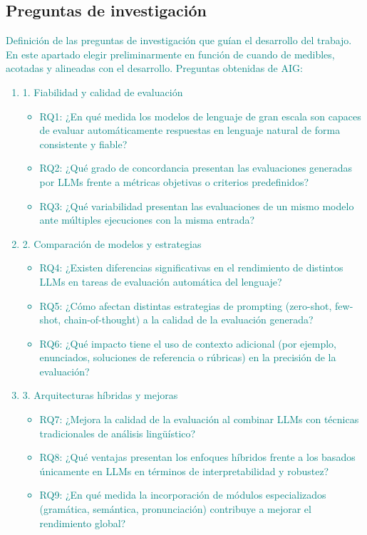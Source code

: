 \subsection{Preguntas de investigación}
\textcolor{teal}{Definición de las preguntas de investigación que guían el desarrollo del trabajo. En este apartado elegir preliminarmente en función de cuando de medibles, acotadas y alineadas con el desarrollo. Preguntas obtenidas de AIG:
\begin{enumerate}
    \item 1. Fiabilidad y calidad de evaluación
    \begin{itemize}
        \item RQ1: ¿En qué medida los modelos de lenguaje de gran escala son capaces de evaluar automáticamente respuestas en lenguaje natural de forma consistente y fiable?
        \item RQ2: ¿Qué grado de concordancia presentan las evaluaciones generadas por LLMs frente a métricas objetivas o criterios predefinidos?
        \item RQ3: ¿Qué variabilidad presentan las evaluaciones de un mismo modelo ante múltiples ejecuciones con la misma entrada?
    \end{itemize}
    \item 2. Comparación de modelos y estrategias
    \begin{itemize}
        \item RQ4: ¿Existen diferencias significativas en el rendimiento de distintos LLMs en tareas de evaluación automática del lenguaje?
        \item RQ5: ¿Cómo afectan distintas estrategias de prompting (zero-shot, few-shot, chain-of-thought) a la calidad de la evaluación generada?
        \item RQ6: ¿Qué impacto tiene el uso de contexto adicional (por ejemplo, enunciados, soluciones de referencia o rúbricas) en la precisión de la evaluación?
    \end{itemize}
    \item 3. Arquitecturas híbridas y mejoras
    \begin{itemize}
        \item RQ7: ¿Mejora la calidad de la evaluación al combinar LLMs con técnicas tradicionales de análisis lingüístico?
        \item RQ8: ¿Qué ventajas presentan los enfoques híbridos frente a los basados únicamente en LLMs en términos de interpretabilidad y robustez?
        \item RQ9: ¿En qué medida la incorporación de módulos especializados (gramática, semántica, pronunciación) contribuye a mejorar el rendimiento global?

\end{itemize}
\end{enumerate}}
